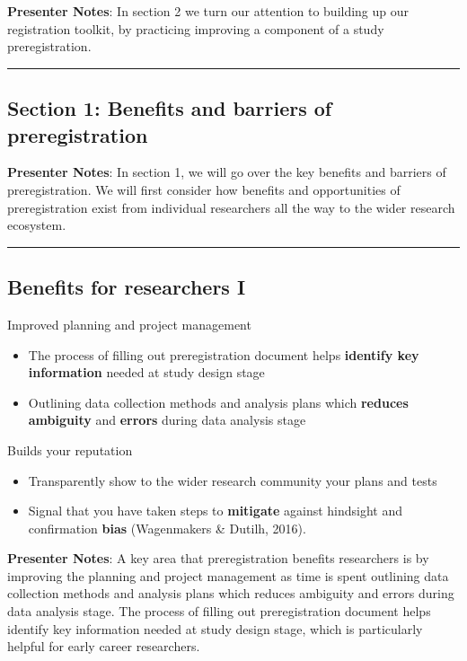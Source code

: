 \documentclass[
  letterpaper,
  DIV=11,
  numbers=noendperiod]{scrartcl}
\providecommand{\tightlist}{%
  \setlength{\itemsep}{0pt}\setlength{\parskip}{0pt}}
\begin{document}
\textbf{Presenter Notes}: In section 2 we turn our attention to building
up our registration toolkit, by practicing improving a component of a
study preregistration.

\begin{center}\rule{0.5\linewidth}{0.5pt}\end{center}

\subsection{Section 1: Benefits and barriers of
preregistration}\label{section-1-benefits-and-barriers-of-preregistration}

\textbf{Presenter Notes}: In section 1, we will go over the key benefits
and barriers of preregistration. We will first consider how benefits and
opportunities of preregistration exist from individual researchers all
the way to the wider research ecosystem.

\begin{center}\rule{0.5\linewidth}{0.5pt}\end{center}

\subsection{Benefits for researchers
I}\label{benefits-for-researchers-i}

Improved planning and project management

\begin{itemize}
\tightlist
\item
  The process of filling out preregistration document helps
  \textbf{identify key information} needed at study design stage
\item
  Outlining data collection methods and analysis plans which
  \textbf{reduces ambiguity} and \textbf{errors} during data analysis
  stage
\end{itemize}

Builds your reputation

\begin{itemize}
\tightlist
\item
  Transparently show to the wider research community your plans and
  tests
\item
  Signal that you have taken steps to \textbf{mitigate} against
  hindsight and confirmation \textbf{bias} (Wagenmakers \& Dutilh,
  2016).
\end{itemize}

\textbf{Presenter Notes}: A key area that preregistration benefits
researchers is by improving the planning and project management as time
is spent outlining data collection methods and analysis plans which
reduces ambiguity and errors during data analysis stage. The process of
filling out preregistration document helps identify key information
needed at study design stage, which is particularly helpful for early
career researchers.
\end{document}
